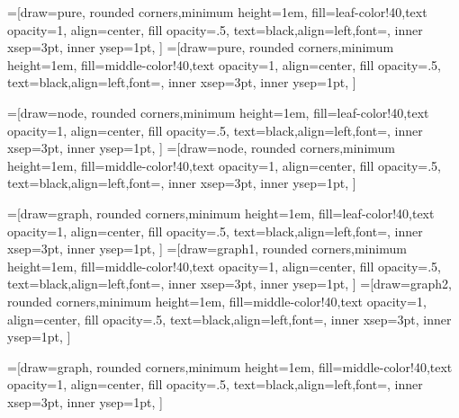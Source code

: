 



=[draw=pure,
    rounded corners,minimum height=1em,
    fill=leaf-color!40,text opacity=1, align=center,
    fill opacity=.5,  text=black,align=left,font=\scriptsize,
    inner xsep=3pt,
    inner ysep=1pt,
]
=[draw=pure,
    rounded corners,minimum height=1em,
    fill=middle-color!40,text opacity=1, align=center,
    fill opacity=.5,  text=black,align=left,font=\scriptsize,
    inner xsep=3pt,
    inner ysep=1pt,
]

    
=[draw=node,
    rounded corners,minimum height=1em,
    fill=leaf-color!40,text opacity=1, align=center,
    fill opacity=.5,  text=black,align=left,font=\scriptsize,
    inner xsep=3pt,
    inner ysep=1pt,
]
=[draw=node,
    rounded corners,minimum height=1em,
    fill=middle-color!40,text opacity=1, align=center,
    fill opacity=.5,  text=black,align=left,font=\scriptsize,
    inner xsep=3pt,
    inner ysep=1pt,
]

=[draw=graph,
    rounded corners,minimum height=1em,
    fill=leaf-color!40,text opacity=1, align=center,
    fill opacity=.5,  text=black,align=left,font=\scriptsize,
    inner xsep=3pt,
    inner ysep=1pt,
]
=[draw=graph1,
    rounded corners,minimum height=1em,
    fill=middle-color!40,text opacity=1, align=center,
    fill opacity=.5,  text=black,align=left,font=\scriptsize,
    inner xsep=3pt,
    inner ysep=1pt,
]
=[draw=graph2,
    rounded corners,minimum height=1em,
    fill=middle-color!40,text opacity=1, align=center,
    fill opacity=.5,  text=black,align=left,font=\scriptsize,
    inner xsep=3pt,
    inner ysep=1pt,
]

=[draw=graph,
    rounded corners,minimum height=1em,
    fill=middle-color!40,text opacity=1, align=center,
    fill opacity=.5,  text=black,align=left,font=\scriptsize,
    inner xsep=3pt,
    inner ysep=1pt,
]

